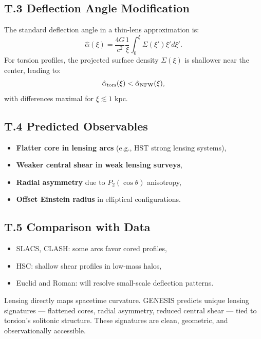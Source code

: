 \documentclass{article}
\begin{document}
\subsection*{T.3 Deflection Angle Modification}
The standard deflection angle in a thin-lens approximation is:
\begin{equation}\label{eq:auto237}
\hat{\alpha}(\xi) = \frac{4G}{c^2} \frac{1}{\xi} \int_0^\xi \Sigma(\xi') \xi' d\xi'.
\end{equation}
For torsion profiles, the projected surface density $\Sigma(\xi)$ is shallower near the center, leading to:
\begin{equation}\label{eq:auto238}
\hat{\alpha}_{\rm tors}(\xi) < \hat{\alpha}_{\rm NFW}(\xi),
\end{equation}
with differences maximal for $\xi \lesssim 1$ kpc.

\subsection*{T.4 Predicted Observables}
\begin{itemize}
  \item \textbf{Flatter core in lensing arcs} (e.g., HST strong lensing systems),
  \item \textbf{Weaker central shear in weak lensing surveys},
  \item \textbf{Radial asymmetry} due to $P_2(\cos\theta)$ anisotropy,
  \item \textbf{Offset Einstein radius} in elliptical configurations.
\end{itemize}

\subsection*{T.5 Comparison with Data}
\begin{itemize}
  \item SLACS, CLASH: some arcs favor cored profiles,
  \item HSC: shallow shear profiles in low-mass halos,
  \item Euclid and Roman: will resolve small-scale deflection patterns.
\end{itemize}

\begin{tcolorbox}[colback=gray!5, colframe=black!30, title=Why this matters]
Lensing directly maps spacetime curvature. GENESIS predicts unique lensing signatures — flattened cores, radial asymmetry, reduced central shear — tied to torsion's solitonic structure.  
These signatures are clean, geometric, and observationally accessible.
\end{tcolorbox}
\end{document}
